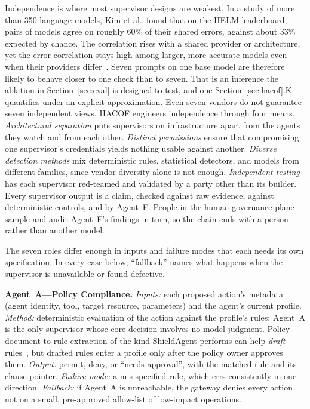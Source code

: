 \documentclass{ieeeaccess}
\newcommand{\hacof}{HACOF}
\begin{document}
Independence is where most supervisor designs are weakest. In a study of more than 350 language models, Kim et al.\ found that on the HELM leaderboard, pairs of models agree on roughly 60\% of their shared errors, against about 33\% expected by chance. The correlation rises with a shared provider or architecture, yet the error correlation stays high among larger, more accurate models even when their providers differ~\cite{kim2025correlated}.
Seven prompts on one base model are therefore likely to behave closer to one check than to seven. That is an inference the ablation in Section~\ref{sec:eval} is designed to test, and one Section~\ref{sec:hacof}.K quantifies under an explicit approximation. Even seven vendors do not guarantee seven independent views. \hacof{} engineers independence through four means. \textit{Architectural separation} puts supervisors on infrastructure apart from the agents they watch and from each other. \textit{Distinct permissions} ensure that compromising one supervisor's credentials yields nothing usable against another. \textit{Diverse detection methods} mix deterministic rules, statistical detectors, and models from different families, since vendor diversity alone is not enough. \textit{Independent testing} has each supervisor red-teamed and validated by a party other than its builder. Every supervisor output is a claim, checked against raw evidence, against deterministic controls, and by Agent~F. People in the human governance plane sample and audit Agent~F's findings in turn, so the chain ends with a person rather than another model.

The seven roles differ enough in inputs and failure modes that each needs its own specification. In every case below, ``fallback'' names what happens when the supervisor is unavailable or found defective.

\textbf{Agent~A---Policy Compliance.} \textit{Inputs:} each proposed action's metadata (agent identity, tool, target resource, parameters) and the agent's current profile. \textit{Method:} deterministic evaluation of the action against the profile's rules; Agent~A is the only supervisor whose core decision involves no model judgment. Policy-document-to-rule extraction of the kind ShieldAgent performs can help \textit{draft} rules~\cite{chen2025shieldagent},
but drafted rules enter a profile only after the policy owner approves them. \textit{Output:} permit, deny, or ``needs approval'', with the matched rule and its clause pointer. \textit{Failure mode:} a mis-specified rule, which errs consistently in one direction. \textit{Fallback:} if Agent~A is unreachable, the gateway denies every action not on a small, pre-approved allow-list of low-impact operations.
\end{document}
